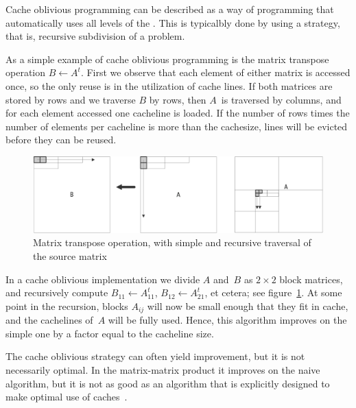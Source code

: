 Cache oblivious programming can be described as a way of programming
that automatically uses all levels of the
. This is typicalbly done by using a
 strategy, that is, recursive
subdivision of a problem.

As a simple example of cache oblivious programming is the matrix
transpose operation $B\leftarrow A^t$. First we observe that each
element of either matrix is accessed once, so the only reuse is in the
utilization of cache lines. If both matrices are stored by
rows and we traverse $B$ by rows, then $A$~is traversed by columns,
and for each element accessed one cacheline is loaded. If the number
of rows times the number of elements per cacheline is more than the
cachesize, lines will be evicted before they can be reused.

\begin{figure}[ht]
  \includegraphics[scale=.1]{graphics-public/oblivious1}
  \caption{Matrix transpose operation, with simple and recursive
    traversal of the source matrix}
  \label{fig:oblivious-transpose}
\end{figure}
In a cache oblivious implementation we divide $A$ and~$B$ as
$2\times2$ block matrices, and recursively compute $B_{11}\leftarrow
A_{11}^t$, $B_{12}\leftarrow A_{21}^t$, et cetera; see
figure~\ref{fig:oblivious-transpose}. At some point in the recursion,
blocks $A_{ij}$ will now be small enough that they fit in cache, and
the cachelines of~$A$ will be fully used. Hence, this algorithm
improves on the simple one by a factor equal to the cacheline size.

The cache oblivious strategy can often yield improvement, but it is
not necessarily optimal. In the matrix-matrix product it improves on
the naive algorithm, but it is not as good as an algorithm that is
explicitly designed to make optimal use of
caches~\cite{GotoGeijn:2008:Anatomy}.

